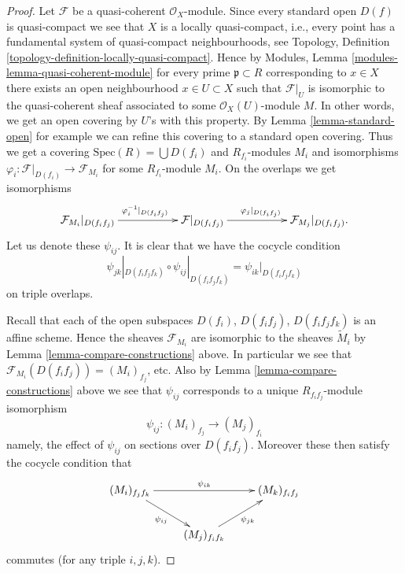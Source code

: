 \begin{proof}
Let $\mathcal{F}$ be a quasi-coherent $\mathcal{O}_X$-module.
Since every standard open $D(f)$ is quasi-compact we see that
$X$ is a locally quasi-compact, i.e., every point has a fundamental
system of quasi-compact neighbourhoods, see Topology,
Definition \ref{topology-definition-locally-quasi-compact}.
Hence by Modules, Lemma \ref{modules-lemma-quasi-coherent-module}
for every prime $\mathfrak p \subset R$ corresponding to $x \in X$
there exists an open neighbourhood $x \in U \subset X$ such that
$\mathcal{F}|_U$ is isomorphic to the quasi-coherent
sheaf associated to some $\mathcal{O}_X(U)$-module $M$.
In other words, we get an open covering by $U$'s with this property.
By Lemma \ref{lemma-standard-open} for example we can refine this
covering to  a standard open covering.
Thus we get a covering $\text{Spec}(R) = \bigcup D(f_i)$
and $R_{f_i}$-modules $M_i$ and isomorphisms
$\varphi_i : \mathcal{F}|_{D(f_i)} \to \mathcal{F}_{M_i}$
for some $R_{f_i}$-module $M_i$. On the overlaps
we get isomorphisms
$$
\xymatrix{
\mathcal{F}_{M_i}|_{D(f_if_j)}
\ar[rr]^{\varphi_i^{-1}|_{D(f_if_j)}}
& &
\mathcal{F}|_{D(f_if_j)}
\ar[rr]^{\varphi_j|_{D(f_if_j)}}
& &
\mathcal{F}_{M_j}|_{D(f_if_j)}.
}
$$
Let us denote these $\psi_{ij}$. It is clear that
we have the cocycle condition
$$
\psi_{jk}|_{D(f_if_jf_k)}
\circ
\psi_{ij}|_{D(f_if_jf_k)}
=
\psi_{ik}|_{D(f_if_jf_k)}
$$
on triple overlaps.

\medskip\noindent
Recall that each of the open subspaces $D(f_i)$, $D(f_if_j)$,
$D(f_if_jf_k)$ is an affine scheme. Hence the sheaves $\mathcal{F}_{M_i}$
are isomorphic to the sheaves $\widetilde M_i$ by Lemma
\ref{lemma-compare-constructions} above. In particular we see that
$\mathcal{F}_{M_i}(D(f_if_j)) = (M_i)_{f_j}$, etc.
Also by Lemma \ref{lemma-compare-constructions} above we see
that $\psi_{ij}$ corresponds to a unique $R_{f_if_j}$-module isomorphism
$$
\psi_{ij} : (M_i)_{f_j} \longrightarrow (M_j)_{f_i}
$$
namely, the effect of $\psi_{ij}$ on sections over $D(f_if_j)$.
Moreover these then satisfy the cocycle condition that
$$
\xymatrix{
(M_i)_{f_jf_k}
\ar[rd]_{\psi_{ij}}
\ar[rr]^{\psi_{ik}}
& &
(M_k)_{f_if_j} \\
&
(M_j)_{f_if_k} \ar[ru]_{\psi_{jk}}
}
$$
commutes (for any triple $i, j, k$).


\end{proof}
